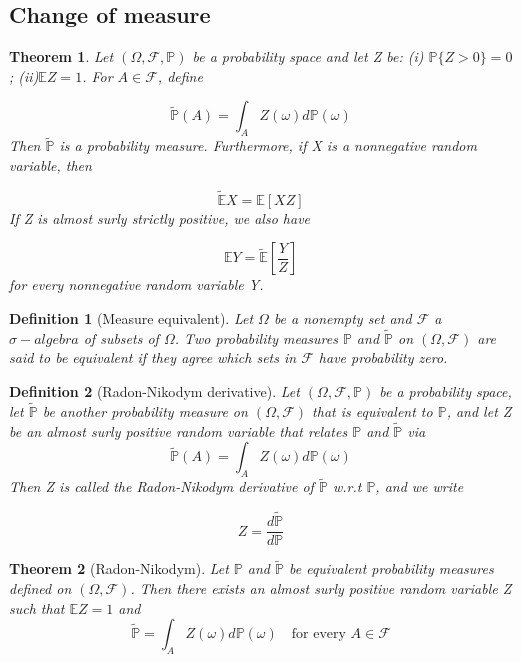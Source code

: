 \documentclass[a4]{article}
\newtheorem{theorem}{Theorem}
\newtheorem{definition}{Definition}
\begin{document}
\subsection{Change of measure}
\begin{theorem}
	\quad \bigbreak 
	Let  $(\Omega, \mathcal{F}, \mathbb{P})$ be a probability space and let Z be: (i) $\mathbb{P}\{Z>0\}=0$; (ii)$\mathbb{E}Z = 1$. For $A\in\mathcal{F}$, define\par 
	$$
	\tilde{\mathbb{P}}(A) = \int_{A}Z(\omega)d\mathbb{P}(\omega)
	$$
	Then $\tilde{\mathbb{P}}$ is a probability measure. Furthermore, if X is a nonnegative random variable, then \par 
	$$
	\tilde{\mathbb{E}}X = \mathbb{E}[XZ]
	$$
	If Z is almost surly strictly positive, we also have\par 
	$$
	\mathbb{E}Y = \tilde{\mathbb{E}}\left[\frac{Y}{Z}\right]
	$$
	for every nonnegative random variable Y.\par 
\end{theorem}
\begin{definition}[Measure equivalent]
	\quad \par \bigbreak
	Let $\Omega$ be a nonempty set and $\mathcal{F}$ a $\sigma-algebra$ of subsets of $\Omega$. Two probability measures $\mathbb{P}$ and $\tilde{\mathbb{P}}$ on $(\Omega, \mathcal{F})$ are said to be equivalent if they agree which sets in $\mathcal{F}$ have probability zero.
\end{definition}
\begin{definition}[Radon-Nikodym derivative]
	\quad \bigbreak 
Let  $(\Omega, \mathcal{F}, \mathbb{P})$ be a probability space, let $\tilde{\mathbb{P}}$ be another probability measure on $(\Omega, \mathcal{F})$ that is equivalent to $\mathbb{P}$, and let Z be an almost surly positive random variable that relates $\mathbb{P}$ and $\tilde{\mathbb{P}}$ via $$\tilde{\mathbb{P}}(A) = \int_{A}Z(\omega)d\mathbb{P}(\omega)$$ Then Z is called the Radon-Nikodym derivative of $\tilde{\mathbb{P}}$ w.r.t $\mathbb{P}$, and we write\par 
$$
Z = \frac{d\tilde{\mathbb{P}}}{d\mathbb{P}}
$$
\end{definition}
\begin{theorem}[Radon-Nikodym]Let $\mathbb{P}$ and $\tilde{\mathbb{P}}$ be equivalent probability measures defined on $(\Omega, \mathcal{F})$. Then there exists an almost surly positive random variable Z such that $\mathbb{E}Z = 1$ and $$\tilde{\mathbb{P}} = \int_{A}Z(\omega)d\mathbb{P}(\omega) \quad \text{for every $A\in \mathcal{F}$}
	$$
\end{theorem}
\end{document}
